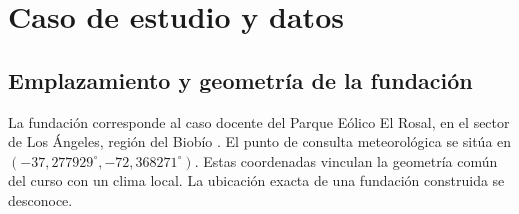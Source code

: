 \section{Caso de estudio y datos}
\label{sec:caso-datos}


\subsection{Emplazamiento y geometría de la fundación}
\label{sec:emplazamiento-geometria}
La fundación corresponde al caso docente del Parque Eólico El Rosal, en el sector de Los Ángeles, región del Biobío \citep{cursoSitios2026}. El punto de consulta meteorológica se sitúa en $(-37{,}277929^\circ,-72{,}368271^\circ)$. Estas coordenadas vinculan la geometría común del curso con un clima local. La ubicación exacta de una fundación construida se desconoce.

